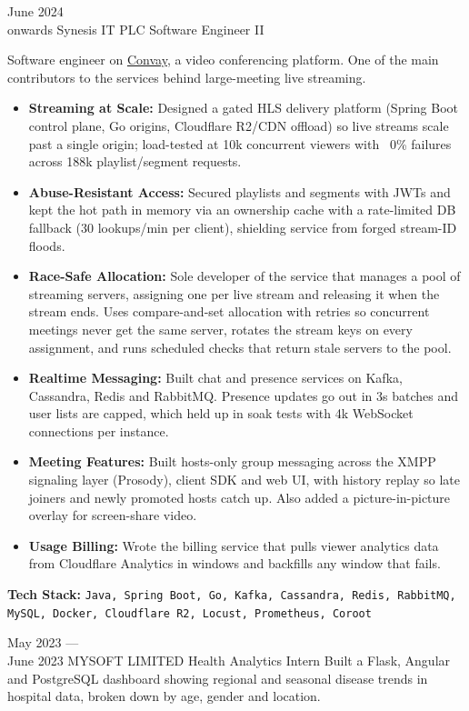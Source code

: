 \documentclass[9pt]{developercv}
\begin{document}
\begin{entrylist}
    \entry
        {June 2024 \\ onwards}
        {Synesis IT PLC}
        {Software Engineer II}
        {Software engineer on \href{https://convay.com}{Convay}, a video conferencing platform. One of the main contributors to the services behind large-meeting live streaming.
        \begin{itemize}\setlength\itemsep{0.05em}
            \item \textbf{Streaming at Scale:} Designed a gated HLS delivery platform (Spring Boot control plane, Go origins, Cloudflare R2/CDN offload) so live streams scale past a single origin; load-tested at 10k concurrent viewers with ~0\% failures across 188k playlist/segment requests.
            \item \textbf{Abuse-Resistant Access:} Secured playlists and segments with JWTs and kept the hot path in memory via an ownership cache with a rate-limited DB fallback (30 lookups/min per client), shielding service from forged stream-ID floods.
            \item \textbf{Race-Safe Allocation:} Sole developer of the service that manages a pool of streaming servers, assigning one per live stream and releasing it when the stream ends. Uses compare-and-set allocation with retries so concurrent meetings never get the same server, rotates the stream keys on every assignment, and runs scheduled checks that return stale servers to the pool.
            \item \textbf{Realtime Messaging:} Built chat and presence services on Kafka, Cassandra, Redis and RabbitMQ. Presence updates go out in 3s batches and user lists are capped, which held up in soak tests with 4k WebSocket connections per instance.
            \item \textbf{Meeting Features:} Built hosts-only group messaging across the XMPP signaling layer (Prosody), client SDK and web UI, with history replay so late joiners and newly promoted hosts catch up. Also added a picture-in-picture overlay for screen-share video.
            \item \textbf{Usage Billing:} Wrote the billing service that pulls viewer analytics data from Cloudflare Analytics in windows and backfills any window that fails.
        \end{itemize}
        \textbf{Tech Stack:} {\large \texttt{Java, Spring Boot, Go, Kafka, Cassandra, Redis, RabbitMQ, MySQL, Docker, Cloudflare R2, Locust, Prometheus, Coroot}}
        }
\end{entrylist}
\begin{entrylist}
	\entry
        {May 2023 --- \\ June 2023}
		{MYSOFT LIMITED}
		{Health Analytics Intern}
		{Built a Flask, Angular and PostgreSQL dashboard showing regional and seasonal disease trends in hospital data, broken down by age, gender and location.}
\end{entrylist}
\end{document}
